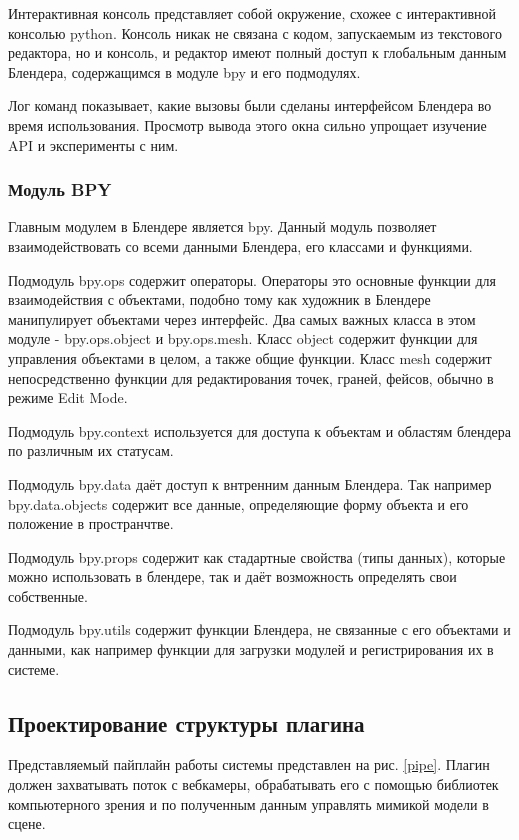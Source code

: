 Интерактивная консоль представляет собой окружение, схожее с интерактивной консолью python. Консоль никак не связана с кодом, запускаемым из текстового редактора, но и консоль, и редактор имеют полный доступ к глобальным данным Блендера, содержащимся в модуле bpy и его подмодулях.

Лог команд показывает, какие вызовы были сделаны интерфейсом Блендера во время использования. Просмотр вывода этого окна сильно упрощает изучение API и эксперименты с ним.

\subsubsection{Модуль BPY}

Главным модулем в Блендере является bpy. Данный модуль позволяет взаимодействовать со всеми данными Блендера, его классами и функциями. 

Подмодуль bpy.ops содержит операторы. Операторы это основные функции для взаимодействия с объектами, подобно тому как художник в Блендере манипулирует объектами через интерфейс.
Два самых важных класса в этом модуле -  bpy.ops.object и bpy.ops.mesh. Класс object содержит функции для управления объектами в целом, а также общие функции. Класс mesh содержит непосредственно функции для редактирования точек, граней, фейсов, обычно в режиме Edit Mode.

Подмодуль bpy.context используется для доступа к объектам и областям блендера по различным их статусам.

Подмодуль bpy.data даёт доступ к внтренним данным Блендера. Так например  bpy.data.objects содержит все данные, определяющие форму объекта и его положение в пространчтве.

Подмодуль bpy.props содержит как стадартные свойства (типы данных), которые можно использовать в блендере, так и даёт возможность определять свои собственные.

Подмодуль bpy.utils содержит функции Блендера, не связанные с его объектами и данными, как например функции для загрузки модулей и регистрирования их в системе.

\subsection{Проектирование структуры плагина}

Представляемый пайплайн работы системы представлен на рис. \ref{pipe}. Плагин должен захватывать поток с вебкамеры, обрабатывать его с помощью библиотек компьютерного зрения и по полученным данным управлять мимикой модели в сцене.

